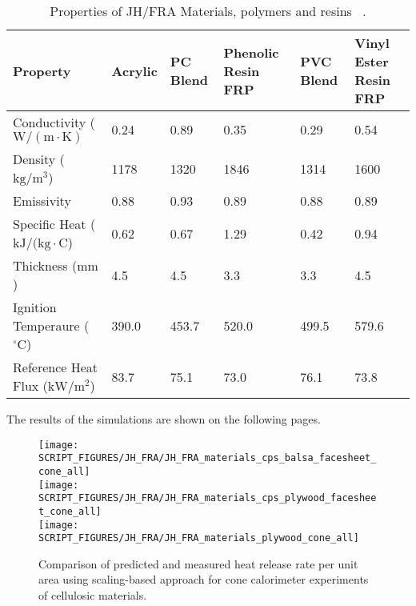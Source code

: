 \begin{table}[!h]
\caption[Properties of JH/FRA Materials, polymers and resins]{Properties of JH/FRA Materials, polymers and resins ~\cite{Luo:FRA2019}.}
\centering
\begin{tabular}{|l|p{1.2cm}|p{1.2cm}|p{1.2cm}|p{1.2cm}|p{1.2cm}|}
\hline
Property                                    &     Acrylic   &     PC Blend  &  Phenolic Resin FRP & PVC Blend  & Vinyl Ester Resin FRP \\ \hline
Conductivity    ($\mathrm{W/(m\cdot K)}$    &  0.24         &     0.89      &  0.35               &  0.29      &  0.54 \\ \hline
Density        ($\mathrm{kg/m^{3}}$)        &  1178         &     1320      &  1846               &  1314      &  1600  \\ \hline
Emissivity                                  &  0.88         &     0.93      &  0.89               &  0.88      &  0.89   \\ \hline
Specific Heat  ($\mathrm{kJ/(kg\cdot C}$)   &  0.62         &     0.67      &  1.29               &  0.42      &  0.94 \\ \hline
Thickness ($\mathrm{mm}$)                   &  4.5          &     4.5       &  3.3                &  3.3       &  4.5 \\ \hline
Ignition Temperaure ($\mathrm{^{\circ}C}$)  &  390.0        &     453.7     &  520.0              &  499.5     &  579.6 \\ \hline
Reference Heat Flux ($\mathrm{kW/m^{2}}$)   &  83.7         &     75.1      &  73.0               &  76.1      &  73.8 \\ \hline
\end{tabular}
\label{Properties_JH_FRA_Materials_polymers}
\end{table}

The results of the simulations are shown on the following pages.

\begin{figure}[h!]
\texttt{[image: SCRIPT\_FIGURES/JH\_FRA/JH\_FRA\_materials\_cps\_balsa\_facesheet\_cone\_all]} \\
\texttt{[image: SCRIPT\_FIGURES/JH\_FRA/JH\_FRA\_materials\_cps\_plywood\_facesheet\_cone\_all]} \\
\texttt{[image: SCRIPT\_FIGURES/JH\_FRA/JH\_FRA\_materials\_plywood\_cone\_all]}
\caption[Heat release rate per unit area of JH/FRA materials using scaling model, cellulosic materials]
{Comparison of predicted and measured heat release rate per unit area using scaling-based approach for cone calorimeter experiments of cellulosic materials.}
\label{JH_FRA_HRR_cellulosic}
\end{figure}

